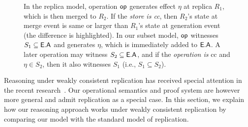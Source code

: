 \begin{figure}
{}
\hspace*{0.1in}
 \caption{In the replica model, operation $\textsf{op}$ generates effect
$\eta$ at replica $R_1$, which is then merged to $R_2$. If the
\emph{store is {\sc cc}}, then $R_2$'s state at merge event is same or
larger than $R_1$'s state at generation event (the difference is
highlighted). In our subset model, $\textsf{op}$ witnesses $S_1 \subseteq
\textsf{E}.\textsf{A}$ and generates $\eta$, which is immediately added to $\textsf{E}.\textsf{A}$. A
later operation may witness $S_2 \subseteq \textsf{E}.\textsf{A}$, and if the
\emph{operation is} {\sc cc} and $\eta \in S_2$, then it also
witnesses $S_1$ (i.e., $S_1 \subseteq S_2$). } 
\label{fig:ec-theirs-vs-ours}
\end{figure}

Reasoning under weakly consistent replication has received special
attention in the recent research~\cite{gotsmanpopl16}. Our operational
semantics and proof system are however more general and admit
replication as a special case. In this section, we explain how our
reasoning approach works under weakly consistent replication by
comparing our model with the standard model of replication.

